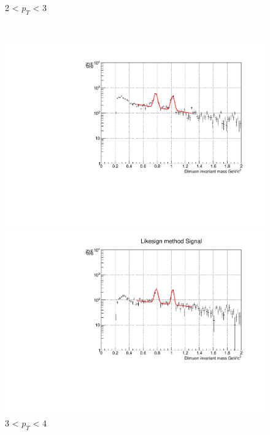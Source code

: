 \begin{figure}[htbp]
\begin{minipage}{0.45\textwidth}
                        \caption{2 < $p_{T}$ < 3}
                        \label{Analysis:Dimuon:Yield:fit_2to3}
                    \end{minipage}
                    \\
                    \vspace{1em}
                    \begin{minipage}{0.45\textwidth}
                        \centering
                        \includegraphics[width=\textwidth]{fig/3_4_2_fit_pt_3to4.pdf}
                        \captionsetup{labelformat=empty}
                        \caption{3 < $p_{T}$ < 4}
                        \label{Analysis:Dimuon:Yield:fit_3to4}
                    \end{minipage}
                    \hfill
                    \begin{minipage}{0.45\textwidth}
                        \centering
                        \includegraphics[width=\textwidth]{fig/3_4_2_fit_pt_4to5.pdf}

\end{minipage}
\end{figure}
